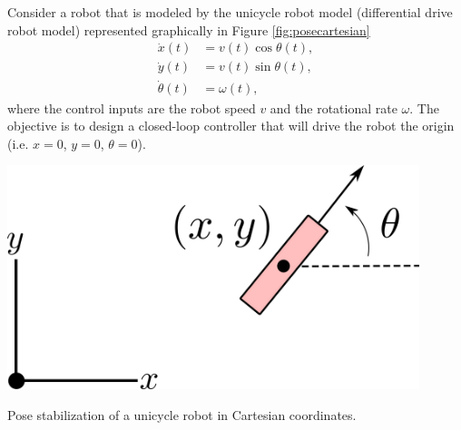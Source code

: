 \begin{example} \label{ex:pose}
\theoremstyle{definition}
\cite{AicardiCasalinoEtAl1995} Consider a robot that is modeled by the unicycle robot model (differential drive robot model) represented graphically in Figure \ref{fig:posecartesian}
\begin{equation} \label{eq:posecartesian}
\begin{split}
\dot{x}(t) &= v(t) \cos\theta(t), \\
\dot{y}(t) &= v(t) \sin\theta(t), \\
\dot{\theta}(t) &= \omega(t),
\end{split}
\end{equation}
where the control inputs are the robot speed $v$ and the rotational rate $\omega$. The objective is to design a closed-loop controller that will drive the robot the origin (i.e. $x=0$, $y=0$, $\theta = 0$).

\begin{marginfigure}
\centering
\includegraphics[width=0.9\textwidth]{tex/figs/ch03_figs/unicycle_cartesian.png}
\caption{Pose stabilization of a unicycle robot in Cartesian coordinates.}
\label{fig:posecartesian}
\end{marginfigure}


\end{example}
